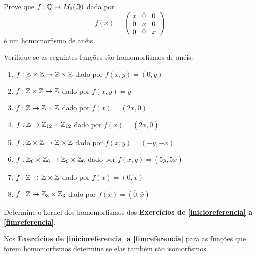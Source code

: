 \documentclass[12pt]{exam}
\begin{document}
    \questao{} Prove que $f : \mathbb{Q} \to M_3(\mathbb{Q})$ dada por
    \[
        f(x) = \begin{pmatrix}
            x & 0 & 0\\
            0 & x & 0\\
            0 & 0 & x
        \end{pmatrix}
    \]
    \'e um homomorfismo de an\'eis.

    \vspace{.3cm}


     Verifique se as seguintes fun\c{c}\~oes s{\~a}o homomorfismos de an\'eis:
    \begin{enumerate}[label=({\alph*})]
        \item $f : \mathbb{Z}\times\mathbb{Z} \to \mathbb{Z}\times\mathbb{Z}$ dado por $f(x,y) = (0,y)$

        \item $f : \mathbb{Z}\times\mathbb{Z} \to \mathbb{Z}$ dado por $f(x,y) = y$

        \item $f : \mathbb{Z}\to \mathbb{Z}\times\mathbb{Z}$ dado por $f(x) = (2x,0)$

        \item $f : \mathbb{Z}\to \mathbb{Z}_{12}\times\mathbb{Z}_{12}$ dado por $f(x) = (\overline{2}\overline{x},\overline{0})$

        \item $f : \mathbb{Z}\times\mathbb{Z} \to \mathbb{Z}\times\mathbb{Z}$ dado por $f(x,y) = (-y,-x)$

        \item $f : \mathbb{Z}_6\times\mathbb{Z}_6 \to \mathbb{Z}_6\times\mathbb{Z}_6$ dado por $f(x,y) = (\overline{5}\overline{y},\overline{5}\overline{x})$

        \item $f : \mathbb{Z} \to \mathbb{Z}\times\mathbb{Z}$ dado por $f(x) = (0,x)$

        \item $f : \mathbb{Z} \to \mathbb{Z}_3\times\mathbb{Z}_3$ dado por $f(x) = (\overline{0},\overline{x})$
    \end{enumerate}

    \vspace{.3cm}

    \questao{} Determine o kernel dos homomorfismos dos \textbf{Exerc{\'i}cios de \ref{inicioreferencia} a \ref{fimreferencia}}.

    \vspace{.3cm}

    \questao{} Nos \textbf{Exerc{\'\i}cios de \ref{inicioreferencia} a \ref{fimreferencia}} para as fun\c{c}\~oes que forem homomorfismos determine se elas tamb\'em s\~ao isomorfismos.
\end{document}
